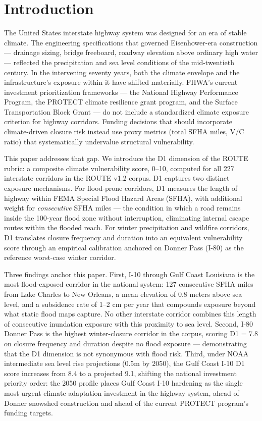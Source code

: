 \section{Introduction}

The United States interstate highway system was designed for an era of stable climate. The
engineering specifications that governed Eisenhower-era construction --- drainage sizing, bridge
freeboard, roadway elevation above ordinary high water --- reflected the precipitation and sea
level conditions of the mid-twentieth century. In the intervening seventy years, both the climate
envelope and the infrastructure's exposure within it have shifted materially. FHWA's current
investment prioritization frameworks --- the National Highway Performance Program, the PROTECT
climate resilience grant program, and the Surface Transportation Block Grant --- do not include
a standardized climate exposure criterion for highway corridors. Funding decisions that should
incorporate climate-driven closure risk instead use proxy metrics (total SFHA miles, V/C ratio)
that systematically undervalue structural vulnerability.

This paper addresses that gap. We introduce the D1 dimension of the ROUTE rubric: a composite
climate vulnerability score, 0--10, computed for all 227 interstate corridors in the ROUTE
v1.2 corpus. D1 captures two distinct exposure mechanisms. For flood-prone corridors, D1
measures the length of highway within FEMA Special Flood Hazard Areas (SFHA), with additional
weight for \emph{consecutive} SFHA miles --- the condition in which a road remains inside the
100-year flood zone without interruption, eliminating internal escape routes within the flooded
reach. For winter precipitation and wildfire corridors, D1 translates closure frequency and
duration into an equivalent vulnerability score through an empirical calibration anchored on
Donner Pass (I-80) as the reference worst-case winter corridor.

Three findings anchor this paper. First, I-10 through Gulf Coast Louisiana is the most
flood-exposed corridor in the national system: 127 consecutive SFHA miles from Lake Charles
to New Orleans, a mean elevation of 0.8 meters above sea level, and a subsidence rate of
1--2 cm per year that compounds exposure beyond what static flood maps capture. No other
interstate corridor combines this length of consecutive inundation exposure with this
proximity to sea level. Second, I-80 Donner Pass is the highest winter-closure corridor in
the corpus, scoring D1 = 7.8 on closure frequency and duration despite no flood exposure ---
demonstrating that the D1 dimension is not synonymous with flood risk. Third, under NOAA
intermediate sea level rise projections (0.5m by 2050), the Gulf Coast I-10 D1 score
increases from 8.4 to a projected 9.1, shifting the national investment priority order:
the 2050 profile places Gulf Coast I-10 hardening as the single most urgent climate
adaptation investment in the highway system, ahead of Donner snowshed construction and ahead
of the current PROTECT program's funding targets.

